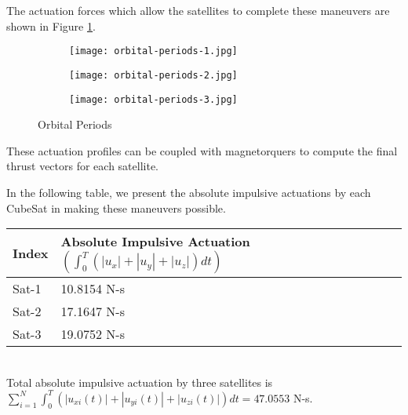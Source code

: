 The actuation forces which allow the satellites to complete these
maneuvers are shown in Figure \ref{fig:orbitals}.

\begin{figure}
\centering

\begin{subfigure}{0.4\textwidth}
\texttt{[image: orbital-periods-1.jpg]}
\end{subfigure}
\hfill
\begin{subfigure}{0.4\textwidth}
\texttt{[image: orbital-periods-2.jpg]}
\end{subfigure}
\hfill
\begin{subfigure}{0.4\textwidth}
\texttt{[image: orbital-periods-3.jpg]}
\end{subfigure}

\caption{Orbital Periods}
\label{fig:orbitals}
\end{figure}

These actuation profiles can be coupled with magnetorquers to compute
the final thrust vectors for each satellite.

In the following table, we present the absolute impulsive actuations
by each CubeSat in making these maneuvers possible.

\begin{tabular}{|l|l|}
\hline
Index & Absolute Impulsive Actuation $(\int_{0}^{T} (|u_x| + |u_y| + |u_z|) dt)$\\
\hline
Sat-1 & 10.8154 N-s\\
Sat-2 & 17.1647 N-s\\
Sat-3 & 19.0752 N-s\\
\hline
\end{tabular}
\\

Total absolute impulsive actuation by three satellites is
$\sum_{i=1}^{N} \int_{0}^{T} (|u_{xi}(t)| + |u_{yi}(t)| + |u_{zi}(t)|) dt = 47.0553$ N-s.
\\


